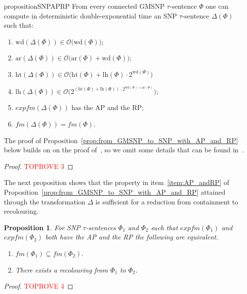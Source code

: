 \documentclass[oneside,reqno,12pt]{amsart}
\theoremstyle{plain}
\newtheorem{proposition}[thm]{Proposition}
\theoremstyle{remark}
\newcommand{\fm}{\ensuremath{\mathit{fm}}\xspace}
\newcommand{\efm}{\ensuremath{\mathit{expfm}}\xspace}
\newcommand{\hh}{\ensuremath{\mathrm{ht}}\xspace}
\newcommand{\lh}{\ensuremath{\mathrm{lh}}\xspace}
\newcommand{\wh}{\ensuremath{\mathrm{wd}}\xspace}
\newcommand{\ar}{\ensuremath{\mathrm{ar}}\xspace}
\begin{document}
{ 
 \begin{restatable}{proposition}{SNPAPRP}    \label{prop:from_GMSNP_to_SNP_with_AP_and_RP}  
 From every connected GMSNP $\tau$-sentence $\Phi$ one can compute in deterministic double-exponential time
an SNP $\tau$-sentence $\Delta(\Phi)$ such that:
\begin{enumerate} 
    \item $\wh(\Delta(\Phi)) \in \mathcal{O}\bigl(\wh(\Phi)\bigr)$;
    \item $\ar(\Delta(\Phi)) \in \mathcal{O}\bigl(\ar(\Phi)+\wh(\Phi)\bigr)$;
    \item $\hh(\Delta(\Phi)) \in \mathcal{O}\bigl(\hh(\Phi)+\lh(\Phi)\cdot 2^{\wh(\Phi)}\bigr)$
    \item $\lh(\Delta(\Phi)) \in \mathcal{O}\bigl(2^{(\hh(\Phi)+\lh(\Phi))\cdot 2^{\wh(\Phi)+\ar(\Phi)}}\bigr)$;
    \item \label{item:AP_andRP} $\efm(\Delta(\Phi))$ has the AP and the RP;
    \item $\fm(\Delta(\Phi))=\fm(\Phi)$.
\end{enumerate}

\end{restatable}
 
 The proof of Proposition~\ref{prop:from_GMSNP_to_SNP_with_AP_and_RP} below builds on on the proof of~\cite[Theorem~5]{bodirsky_asnp}, so we omit some details that can be found in~\cite{bodirsky_asnp}.
\begin{proof}\textcolor{red}{TOPROVE 3}\end{proof}


The next proposition shows that the property in item~\eqref{item:AP_andRP} of Proposition~\ref{prop:from_GMSNP_to_SNP_with_AP_and_RP} attained through the transformation $\Delta$ is sufficient for a reduction from containment to recolouring.
 
 \begin{proposition}    \label{prop:recolouring_containment}
  For SNP $\tau$-sentences $\Phi_1$ and $\Phi_2$ such that $\efm(\Phi_1)$ and $\efm(\Phi_2)$ both have the AP and the RP  the following are equivalent.
\begin{enumerate}
        \item \label{item:recolouring1} $\fm(\Phi_1)\subseteq \fm(\Phi_2)$.
        \item \label{item:recolouring2} There exists a recolouring from $\Phi_1$ to $\Phi_2$.
    \end{enumerate}  
\end{proposition}    
\begin{proof}\textcolor{red}{TOPROVE 4}\end{proof}


}
\end{document}
